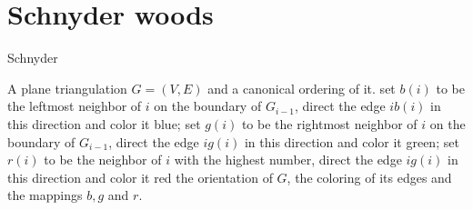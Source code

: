\section{Schnyder woods}

\begin{algorithm}[!ht]
	\caption{Schnyder}
	\begin{algorithmic}[1]
		\Require A plane triangulation $G = (V, E)$ and a canonical ordering of it.
			\State set $b(i)$ to be the leftmost neighbor of $i$ on the boundary of $G_{i-1}$, direct the edge $ib(i)$ in this direction and color it blue;
			\State set $g(i)$ to be the rightmost neighbor of $i$ on the boundary of $G_{i-1}$, direct the edge $ig(i)$ in this direction and color it green;
			\State set $r(i)$ to be the neighbor of $i$ with the highest number, direct the edge $ig(i)$ in this direction and color it red
		\EndFor
		\State \Return the orientation of $G$, the coloring of its edges and the mappings $b, g$ and $r$.
	\end{algorithmic}
\end{algorithm}

